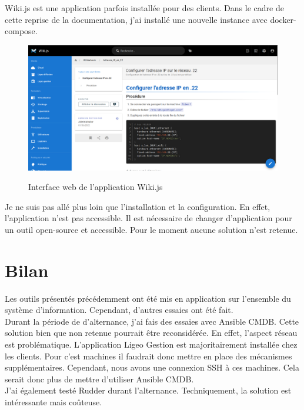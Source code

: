 \documentclass[12pt]{article}
\begin{document}
Wiki.js est une application parfois installée pour des clients. 
Dans le cadre de cette reprise de la documentation, j'ai installé une nouvelle instance avec docker-compose.

\begin{figure}[!ht]
    \centering
    \includegraphics[width=\textwidth]{src/interface_wikijs.png}
    \label{fig:interface_wikijs}
    \caption{Interface web de l'application Wiki.js}
\end{figure}

Je ne suis pas allé plus loin que l'installation et la configuration.
En effet, l'application n'est pas accessible.
Il est nécessaire de changer d'application pour un outil open-source et accessible.
Pour le moment aucune solution n'est retenue.

\newpage
\section{Bilan}
Les outils présentés précédemment ont été mis en application sur l'ensemble du système d'information. 
Cependant, d'autres essaies ont été fait. \\

Durant la période de d'alternance, j'ai fais des essaies avec \gls{Ansible CMDB}. 
Cette solution bien que non retenue pourrait être reconsidérée. 
En effet, l'aspect réseau est problématique.
L'application Ligeo Gestion est majoritairement installée chez les clients.
Pour c'est machines il faudrait donc mettre en place des mécanismes supplémentaires.
Cependant, nous avons une connexion SSH à ces machines.
Cela serait donc plus de mettre d'utiliser \gls{Ansible CMDB}. \\

J'ai également testé Rudder durant l'alternance. 
Techniquement, la solution est intéressante mais coûteuse. \\
\end{document}
